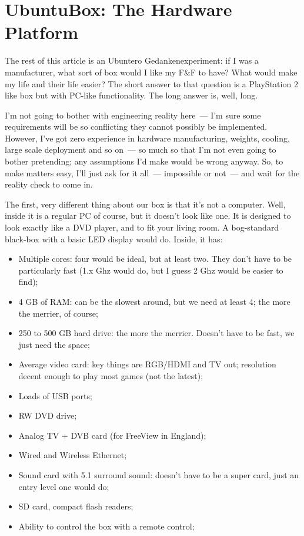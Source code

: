\documentclass{memoir}
\begin{document}
\section{UbuntuBox: The Hardware Platform}

The rest of this article is an Ubuntero Gedankenexperiment: if I was a
manufacturer, what sort of box would I like my F\&F to have? What would
make my life and their life easier? The short answer to that question
is a PlayStation 2 like box but with PC-like functionality. The long
answer is, well, long.

I'm not going to bother with engineering reality here~--- I'm sure
some requirements will be so conflicting they cannot possibly be
implemented. However, I've got zero experience in hardware
manufacturing, weights, cooling, large scale deployment and so on~---
so much so that I'm not even going to bother pretending; any
assumptions I'd make would be wrong anyway. So, to make matters easy,
I'll just ask for it all~--- impossible or not~--- and wait for the
reality check to come in.

The first, very different thing about our box is that it's not a
computer. Well, inside it is a regular PC of course, but it doesn't
look like one. It is designed to look exactly like a DVD player, and
to fit your living room. A bog-standard black-box with a basic LED
display would do. Inside, it has:

\begin{itemize}
\item Multiple cores: four would be ideal, but at least two. They
  don't have to be particularly fast (1.x Ghz would do, but I guess 2
  Ghz would be easier to find);
\item 4 GB of RAM: can be the slowest around, but we need at least 4;
  the more the merrier, of course;
\item 250 to 500 GB hard drive: the more the merrier. Doesn't have to
  be fast, we just need the space;
\item Average video card: key things are RGB/HDMI and TV out;
  resolution decent enough to play most games (not the latest);
\item Loads of USB ports;
\item RW DVD drive;
\item Analog TV + DVB card (for FreeView in England);
\item Wired and Wireless Ethernet;
\item Sound card with 5.1 surround sound: doesn't have to be a super
  card, just an entry level one would do;
\item SD card, compact flash readers;
\item Ability to control the box with a remote control;
\end{itemize}
\end{document}
